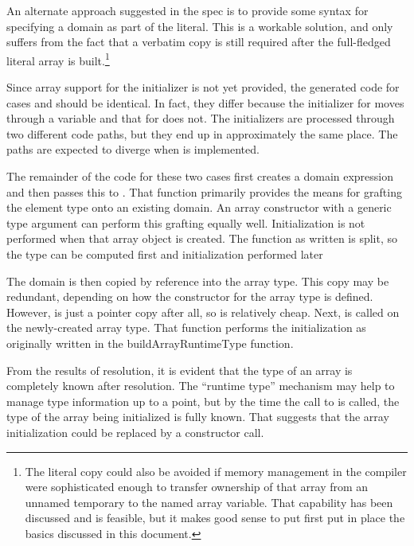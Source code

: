 An alternate approach suggested in
the spec is to provide some syntax for specifying a domain as part of the literal.  
This is a workable solution, and only suffers from the fact that a verbatim copy is still
required after the full-fledged literal array is built.\footnote{The literal copy could also
  be avoided if memory management in the compiler were sophisticated enough to transfer
  ownership of that array from an unnamed temporary to the named array variable.  That
  capability has been discussed and is feasible, but it makes good sense to put first put
  in place the basics discussed in this document.}

Since array support for the  initializer is not yet provided, the generated code for
cases  and  should be identical.  In fact, they differ because the
initializer for  moves through a  variable and that for 
does not.  The initializers are processed through two different code paths, but they end
up in approximately the same place.  The paths are expected to diverge when 
is implemented.

The remainder of the code for these two cases first creates a domain expression and then
passes this to .  That function primarily provides the
means for grafting the element type onto an existing domain.  An array constructor with a
generic type argument can perform this grafting equally well.  Initialization is not
performed when that array object is created.  The function as written is split, so the
type can be computed first and initialization performed later

The domain is then copied by reference into the array type.  This copy may be redundant,
depending on how the constructor for the array type is defined.  However, is just a
pointer copy after all, so is relatively cheap.  Next,
 is called on the newly-created array type.  That
function performs the initialization as originally written in the buildArrayRuntimeType
function.

From the results of resolution, it is evident that the type of an array is completely
known after resolution.  The ``runtime type'' mechanism may help to manage type
information up to a point, but by the time the call to
 is called, the type of the array being initialized
is fully known.  That suggests that the array initialization could be replaced by a
constructor call.


